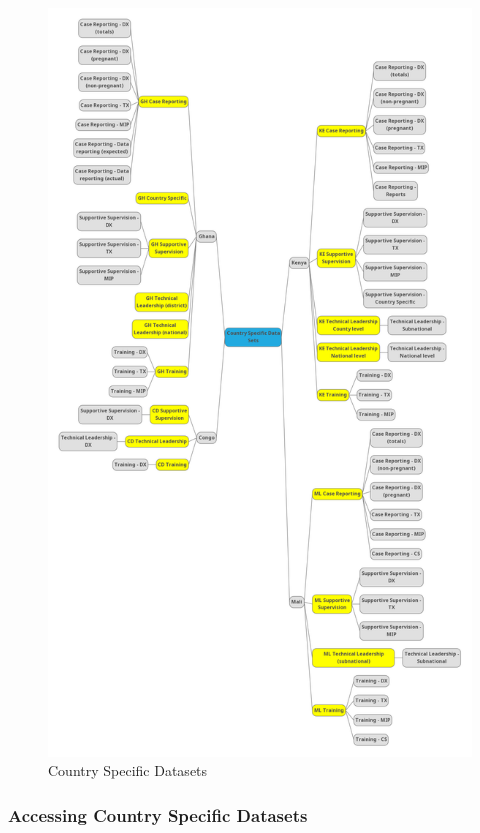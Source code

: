 \documentclass[]{book}
\begin{document}
\begin{figure}
\includegraphics[width=19.26in]{./images/pmp datasets} \caption{Country Specific Datasets}\label{fig:pmp-datasets}
\end{figure}

\hypertarget{accessing-country-specific-datasets}{%
\subsubsection{Accessing Country Specific Datasets}\label{accessing-country-specific-datasets}}
\end{document}

